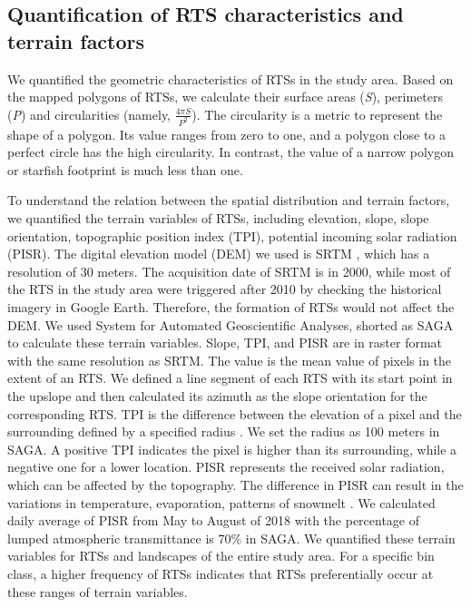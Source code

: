 \documentclass[preprint,12pt,authoryear]{elsarticle}
\begin{document}
\subsection{Quantification of RTS characteristics and terrain factors}
\label{subsec_quantify_rts}

We quantified the geometric characteristics of RTSs in the study area. Based on the mapped polygons of RTSs, we calculate their surface areas (\emph{S}), perimeters (\emph{P}) and circularities (namely, $\frac{4 \pi S}{P^2} $). The circularity is a metric to represent the shape of a polygon. Its value ranges from zero to one, and a polygon close to a perfect circle has the high circularity. In contrast, the value of a narrow polygon or starfish footprint is much less than one. 

To understand the relation between the spatial distribution and terrain factors, we quantified the terrain variables of RTSs, including elevation, slope, slope orientation, topographic position index (TPI), potential incoming solar radiation (PISR). The digital elevation model (DEM) we used is SRTM \citep{farr2007shuttle}, which has a resolution of 30 meters. The acquisition date of SRTM is in 2000, while most of the RTS in the study area were triggered after 2010 by checking the historical imagery in Google Earth. Therefore, the formation of RTSs would not affect the DEM. We used System for Automated Geoscientific Analyses, shorted as SAGA \citep{conrad2015system} to calculate these terrain variables. Slope, TPI, and PISR are in raster format with the same resolution as SRTM. The value is the mean value of pixels in the extent of an RTS. We defined a line segment of each RTS with its start point in the upslope and then calculated its azimuth as the slope orientation for the corresponding RTS. TPI is the difference between the elevation of a pixel and the surrounding defined by a specified radius \citep{guisan1999glm, reu2013application}. We set the radius as 100 meters in SAGA. A positive TPI indicates the pixel is higher than its surrounding, while a negative one for a lower location. PISR represents the received solar radiation, which can be affected by the topography. The difference in PISR can result in the variations in temperature, evaporation, patterns of snowmelt \citep{bohner2009land}. We calculated daily average of PISR from May to August of 2018 with the percentage of lumped atmospheric transmittance is 70\% in SAGA. We quantified these terrain variables for RTSs and landscapes of the entire study area. For a specific bin class, a higher frequency of RTSs indicates that RTSs preferentially occur at these ranges of terrain variables. 
\end{document}
